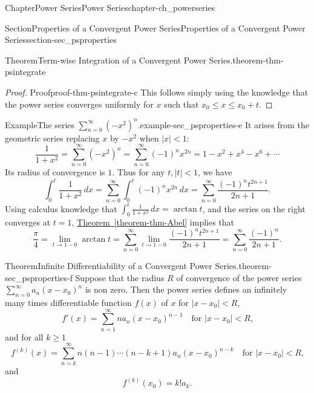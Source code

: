 \documentclass[oneside,10pt,]{book}
\newcommand{\xreffont}{\relax}
\numberwithin{equation}{section}
\newcommand{\lt}{<}
\begin{document}
\begin{chapterptx}{Chapter}{Power Series}{}{Power Series}{}{}{chapter-ch_powerseries}
\begin{sectionptx}{Section}{Properties of a Convergent Power Series}{}{Properties of a Convergent Power Series}{}{}{section-sec_psproperties}
\begin{theorem}{Theorem}{Term-wise Integration of a Convergent Power Series.}{}{theorem-thm-psintegrate}
\end{theorem}
\begin{proof}{Proof}{}{proof-thm-psintegrate-c}
This follows simply using the knowledge that the power series converges uniformly for \(x\) such that \(x_{0} \le x \le x_{0}+t\).\end{proof}
\begin{example}{Example}{The series \(\sum_{n=0}^{\infty} (-x^2)^n \).}{example-sec_psproperties-e}%
It arises from the geometric series replacing \(x\) by \(-x^{2}\) when \(|x|\lt 1\):%
\begin{equation*}
\frac{1}{1+x^2}=\sum_{n=0}^{\infty} (-x^2)^n = \sum_{n=0}^{\infty} (-1)^n x^{2n}= 1-x^2+x^4-x^6+\cdots
\end{equation*}
Its radius of convergence is \(1\). Thus for any \(t, |t| < 1\), we have%
\begin{equation*}
\int_{0}^{t} \frac{1}{1+x^2}\, dx = \sum_{n=0}^{\infty} \int_{0}^{t} (-1)^n x^{2n}\, dx
=  \sum_{n=0}^{\infty}\frac{(-1)^n t^{2n+1}}{2n+1}.
\end{equation*}
Using calculus knowledge that \(\int_{0}^{t} \frac{1}{1+x^2}\, dx=\arctan t\), and the series on the right converges at \(t=1\),  \hyperref[theorem-thm-Abel]{Theorem~{\xreffont\ref{theorem-thm-Abel}}} implies that%
\begin{equation*}
\frac{\pi}{4}=\lim_{t\to 1-0} \arctan t= \sum_{n=0}^{\infty}\lim_{t\to 1-0} \frac{(-1)^n t^{2n+1}}{2n+1}
=\sum_{n=0}^{\infty} \frac{(-1)^n }{2n+1}.
\end{equation*}
%
\end{example}
\begin{theorem}{Theorem}{Infinite Differentiability of a Convergent Power Series.}{}{theorem-sec_psproperties-f}%
Suppose  that the radius \(R\) of convergence of the power series \(\sum_{n=0}^{\infty} a_{n}(x-x_{0})^{n}\) is non zero. Then the power series defines an infinitely many times differentiable function \(f(x)\) of \(x\) for \(|x-x_{0}| \lt R\),%
\begin{equation}
f'(x)=\sum_{n=1}^{\infty} n a_{n}(x-x_{0})^{n-1} \quad \text{for $|x-x_{0}| \lt R$,}\label{men-eq-psderivative}
\end{equation}
and for all \(k\ge 1\)%
\begin{equation*}
f^{(k)}(x)=\sum_{n=k}^{\infty} n(n-1)\cdots (n-k+1) a_{n}(x-x_{0})^{n-k} \quad \text{for $|x-x_{0}| \lt R$,}
\end{equation*}
and%
\begin{equation*}
f^{(k)}(x_{0})=k! a_{k}.
\end{equation*}

\end{theorem}
\end{sectionptx}
\end{chapterptx}
\end{document}
